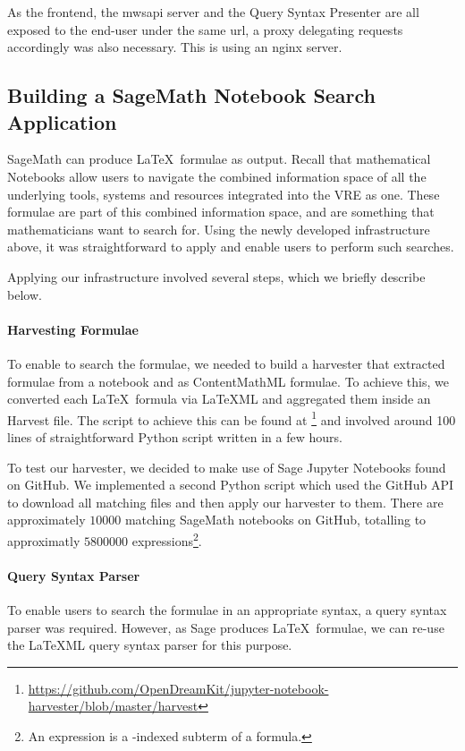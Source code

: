 As the frontend, the mwsapi server and the Query Syntax Presenter are all exposed to the end-user under the same url, a proxy delegating requests accordingly was also necessary. 
This is using an nginx server. 

\subsection{Building a SageMath Notebook Search Application}

SageMath can produce \LaTeX\ formulae as output. 
Recall that mathematical Notebooks allow users to navigate the combined information space of all the underlying tools, systems and resources integrated into the VRE as one. 
These formulae are part of this combined information space, and are something that mathematicians want to search for.
Using the newly developed infrastructure above, it was straightforward to apply \MWS and enable users to perform such searches. 

Applying our infrastructure involved several steps, which we briefly describe below.

\paragraph{Harvesting Formulae}
To enable \MWS to search the formulae, we needed to build a harvester that extracted formulae from a notebook and as ContentMathML formulae. 
To achieve this, we converted each \LaTeX\ formula via LaTeXML and aggregated them inside an \MWS Harvest file. 
The script to achieve this can be found at \footnote{\url{https://github.com/OpenDreamKit/jupyter-notebook-harvester/blob/master/harvest}} and involved around 100 lines of straightforward Python script written in a few hours. 

To test our harvester, we decided to make use of Sage Jupyter Notebooks found on GitHub. 
We implemented a second Python script which used the GitHub API to download all matching files and then apply our harvester to them. 
There are approximately $10000$ matching SageMath notebooks on GitHub, totalling to approximatly $5800000$ expressions\footnote{An expression is a \MWS-indexed subterm of a formula. }. 
\paragraph{Query Syntax Parser}

To enable users to search the formulae in an appropriate syntax, a query syntax parser was required. 
However, as Sage produces \LaTeX\ formulae, we can re-use the {\LaTeX}ML query syntax parser for this purpose. 

